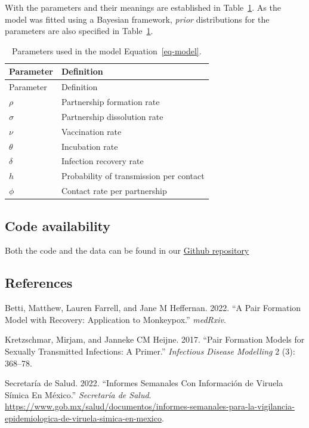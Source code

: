 \documentclass[
  letterpaper,
  DIV=11,
  numbers=noendperiod]{scrartcl}
\newlength{\cslhangindent}
\newlength{\cslentryspacingunit} %
\newenvironment{CSLReferences}[2] %
 {%
  \setlength{\parindent}{0pt}
  \ifodd #1
  \let\oldpar\par
  \def\par{\hangindent=\cslhangindent\oldpar}
  \fi
  \setlength{\parskip}{#2\cslentryspacingunit}
 }%
 {}
\begin{document}
With the parameters and their meanings are established in
Table~\ref{tbl-parameters}. As the model was fitted using a Bayesian
framework, \emph{prior} distributions for the parameters are also
specified in Table~\ref{tbl-parameters}.

\hypertarget{tbl-parameters}{}
\begin{longtable}[]{@{}ll@{}}
\caption{\label{tbl-parameters}Parameters used in the model
Equation~\ref{eq-model}.}\tabularnewline
\toprule()
Parameter & Definition \\
\midrule()
\endfirsthead
\toprule()
Parameter & Definition \\
\midrule()
\endhead
\(\rho\) & Partnership formation rate \\
\(\sigma\) & Partnership dissolution rate \\
\(\nu\) & Vaccination rate \\
\(\theta\) & Incubation rate \\
\(\delta\) & Infection recovery rate \\
\(h\) & Probability of transmission per contact \\
\(\phi\) & Contact rate per partnership \\
\bottomrule()
\end{longtable}

\hypertarget{code-availability}{%
\subsection{Code availability}\label{code-availability}}

Both the code and the data can be found in our
\href{https://github.com/rodrigoZepeda/mpx}{Github repository}

\hypertarget{references}{%
\subsection*{References}\label{references}}

\hypertarget{refs}{}
\begin{CSLReferences}{1}{0}
\leavevmode{}%
Betti, Matthew, Lauren Farrell, and Jane M Heffernan. 2022. {``A Pair
Formation Model with Recovery: Application to Monkeypox.''}
\emph{medRxiv}.

\leavevmode{}%
Kretzschmar, Mirjam, and Janneke CM Heijne. 2017. {``Pair Formation
Models for Sexually Transmitted Infections: A Primer.''}
\emph{Infectious Disease Modelling} 2 (3): 368--78.

\leavevmode{}%
Secretaría de Salud. 2022. {``Informes Semanales Con Información de
Viruela Símica En México.''} \emph{Secretaría de Salud}.
\url{https://www.gob.mx/salud/documentos/informes-semanales-para-la-vigilancia-epidemiologica-de-viruela-simica-en-mexico}.

\end{CSLReferences}
\end{document}
